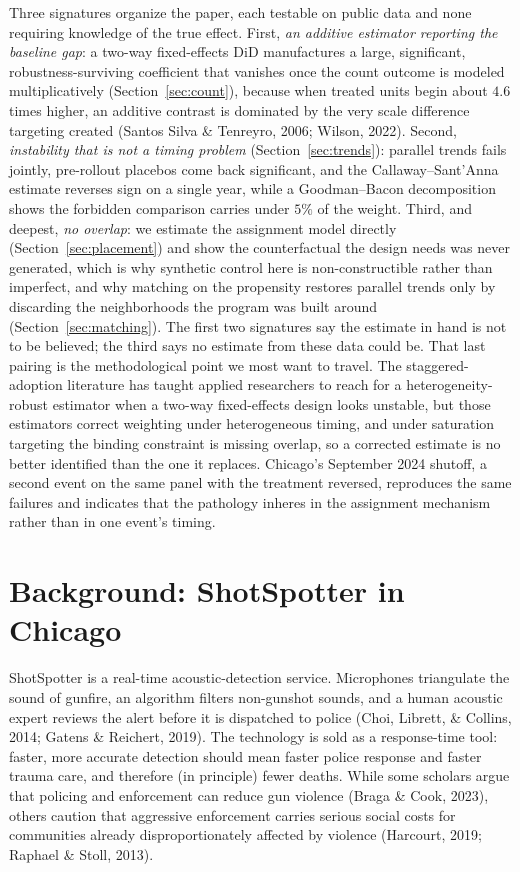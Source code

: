 \documentclass[12pt]{article}
\begin{document}
Three signatures organize the paper, each testable on public data and none requiring
knowledge of the true effect. First, \emph{an additive estimator reporting the baseline
gap}: a two-way fixed-effects DiD manufactures a large, significant, robustness-surviving
coefficient that vanishes once the count outcome is modeled multiplicatively
(Section~\ref{sec:count}), because when treated units begin about $4.6$ times higher, an
additive contrast is dominated by the very scale difference targeting created (Santos Silva
\& Tenreyro, 2006; Wilson, 2022). Second,
\emph{instability that is not a timing problem} (Section~\ref{sec:trends}): parallel trends
fails jointly, pre-rollout placebos come back significant, and the Callaway--Sant'Anna
estimate reverses sign on a single year, while a Goodman--Bacon decomposition shows the
forbidden comparison carries under $5\%$ of the weight. Third, and deepest,
\emph{no overlap}: we estimate the assignment model
directly (Section~\ref{sec:placement}) and show the counterfactual the design needs was
never generated, which is why synthetic control here is non-constructible rather than
imperfect, and why matching on the propensity restores parallel trends only by discarding
the neighborhoods the program was built around (Section~\ref{sec:matching}). The first two
signatures say the estimate in hand is not to be believed; the third says no estimate from
these data could be. That last pairing is the methodological point we most want to
travel. The staggered-adoption literature has taught applied researchers to reach for a
heterogeneity-robust estimator when a two-way fixed-effects design looks unstable, but those
estimators correct weighting under heterogeneous timing, and under saturation targeting the
binding constraint is missing overlap, so a corrected estimate is no better identified than
the one it replaces. Chicago's September 2024 shutoff, a second event on the same panel with
the treatment reversed, reproduces the same failures and indicates that the pathology
inheres in the assignment mechanism rather than in one event's timing.

\section{Background: ShotSpotter in Chicago}

ShotSpotter is a real-time acoustic-detection service. Microphones triangulate the sound
of gunfire, an algorithm filters non-gunshot sounds, and a human acoustic expert reviews
the alert before it is dispatched to police (Choi, Librett, \& Collins, 2014; Gatens \&
Reichert, 2019). The technology is sold as a response-time tool: faster, more accurate
detection should mean faster police response and faster trauma care, and therefore (in
principle) fewer deaths. While some scholars argue that policing and enforcement can
reduce gun violence (Braga \& Cook, 2023), others caution that aggressive enforcement
carries serious social costs for communities already disproportionately affected by
violence (Harcourt, 2019; Raphael \& Stoll, 2013).
\end{document}
